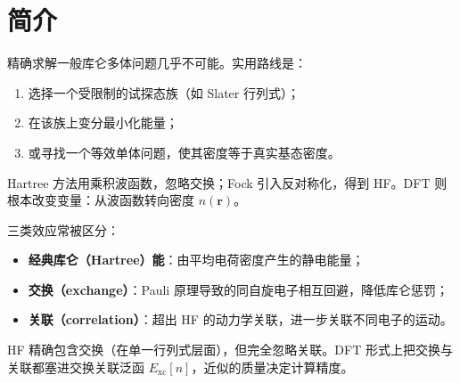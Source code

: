 \section{简介}

精确求解一般库仑多体问题几乎不可能。实用路线是：
\begin{enumerate}
  \item 选择一个受限制的试探态族（如 Slater 行列式）；
  \item 在该族上变分最小化能量；
  \item 或寻找一个等效单体问题，使其密度等于真实基态密度。
\end{enumerate}
Hartree 方法用乘积波函数，忽略交换；Fock 引入反对称化，得到 HF。DFT 则根本改变变量：从波函数转向密度 $n(\mathbf{r})$。

三类效应常被区分：
\begin{itemize}
  \item \textbf{经典库仑（Hartree）能}：由平均电荷密度产生的静电能量；
  \item \textbf{交换（exchange）}：Pauli 原理导致的同自旋电子相互回避，降低库仑惩罚；
  \item \textbf{关联（correlation）}：超出 HF 的动力学关联，进一步关联不同电子的运动。
\end{itemize}

HF 精确包含交换（在单一行列式层面），但完全忽略关联。DFT 形式上把交换与关联都塞进交换关联泛函 $E_{\mathrm{xc}}[n]$，近似的质量决定计算精度。
